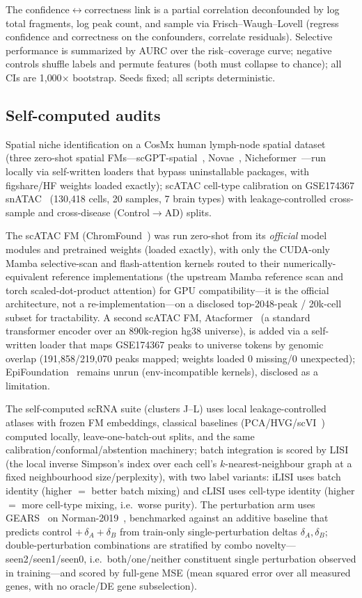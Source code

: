 \documentclass[fleqn,10pt,lineno]{wlpeerj}  %
\begin{document}
The confidence$\leftrightarrow$correctness link is a partial correlation deconfounded by log total fragments, log peak count, and sample via Frisch--Waugh--Lovell (regress confidence and correctness on the confounders, correlate residuals). Selective performance is summarized by AURC over the risk--coverage curve; negative controls shuffle labels and permute features (both must collapse to chance); all CIs are 1{,}000$\times$ bootstrap. Seeds fixed; all scripts deterministic.
\subsection{Self-computed audits}
Spatial niche identification on a CosMx human lymph-node spatial dataset~\cite{wang2026niche} (three zero-shot spatial FMs---scGPT-spatial~\cite{scgptspatial2025}, Novae~\cite{novae2025}, Nicheformer~\cite{nicheformer2025}---run locally via self-written loaders that bypass uninstallable packages, with figshare/HF weights loaded exactly); scATAC cell-type calibration on GSE174367 snATAC~\cite{morabito2021} (130{,}418 cells, 20 samples, 7 brain types) with leakage-controlled cross-sample and cross-disease (Control$\to$AD) splits.

The scATAC FM (ChromFound~\cite{chromfound2025}) was run zero-shot from its \emph{official} model modules and pretrained weights (loaded exactly), with only the CUDA-only Mamba selective-scan and flash-attention kernels routed to their numerically-equivalent reference implementations (the upstream Mamba reference scan and torch scaled-dot-product attention) for GPU compatibility---it is the official architecture, not a re-implementation---on a disclosed top-2048-peak / 20k-cell subset for tractability. A second scATAC FM, Atacformer~\cite{atacformer2024} (a standard transformer encoder over an 890k-region hg38 universe), is added via a self-written loader that maps GSE174367 peaks to universe tokens by genomic overlap (191{,}858/219{,}070 peaks mapped; weights loaded 0 missing/0 unexpected); EpiFoundation~\cite{epifoundation2025} remains unrun (env-incompatible kernels), disclosed as a limitation.

The self-computed scRNA suite (clusters J--L) uses local leakage-controlled atlases with frozen FM embeddings, classical baselines (PCA/HVG/scVI~\cite{lopez2018}) computed locally, leave-one-batch-out splits, and the same calibration/conformal/abstention machinery; batch integration is scored by LISI (the local inverse Simpson's index over each cell's $k$-nearest-neighbour graph at a fixed neighbourhood size/perplexity), with two label variants: iLISI uses batch identity (higher $=$ better batch mixing) and cLISI uses cell-type identity (higher $=$ more cell-type mixing, i.e.\ worse purity). The perturbation arm uses GEARS~\cite{roohani2024} on Norman-2019~\cite{norman2019}, benchmarked against an additive baseline that predicts control $+\,\delta_A+\delta_B$ from train-only single-perturbation deltas $\delta_A,\delta_B$; double-perturbation combinations are stratified by combo novelty---seen2/seen1/seen0, i.e.\ both/one/neither constituent single perturbation observed in training---and scored by full-gene MSE (mean squared error over all measured genes, with no oracle/DE gene subselection).
\end{document}
